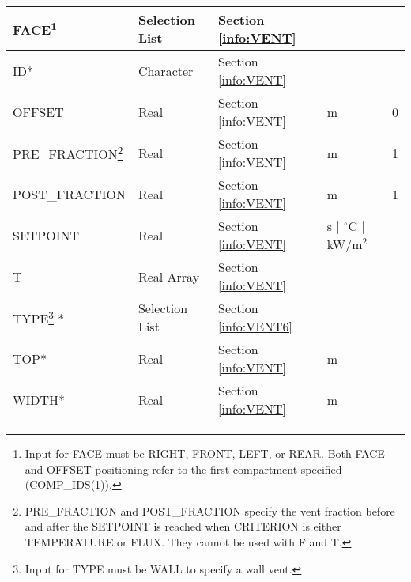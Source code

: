 \begin{minipage}{6.5in}
\begin{longtable}{@{\extracolsep{\fill}}|l|l|l|l|l|}
{\ct FACE}\footnote{Input for {\ct FACE} must be {\ct RIGHT}, {\ct FRONT}, {\ct LEFT}, or {\ct REAR}. Both {\ct FACE} and {\ct OFFSET} positioning refer to the first compartment specified ({\ct COMP\_IDS(1)}).}      	  & Selection List   & Section \ref{info:VENT}                 &                             &                 \\ \hline
{\ct ID}*                                                         & Character  	          & Section \ref{info:VENT}      &                             &                 \\ \hline
{\ct OFFSET}       					 & Real 		  & Section \ref{info:VENT}      & m                           &      0        \\ \hline
{\ct PRE\_FRACTION}\footnote{{\ct PRE\_FRACTION} and {\ct POST\_FRACTION} specify the vent fraction before and after the {\ct SETPOINT} is reached when {\ct CRITERION} is either {\ct TEMPERATURE} or {\ct FLUX}. They cannot be used with {\ct F} and {\ct T}.}       					 & Real 		  & Section \ref{info:VENT}      & m                           &      1        \\ \hline
{\ct POST\_FRACTION}       					 & Real 		  & Section \ref{info:VENT}      & m                           &      1        \\ \hline
{\ct SETPOINT}           					 & Real  	          & Section \ref{info:VENT}      & s $\mid$ $^\circ$C $\mid$ kW/m$^2$ &                 \\ \hline
{\ct T}  					 & Real Array  		  & Section \ref{info:VENT}      &                             &                 \\ \hline
{\ct TYPE}\footnote{Input for {\ct TYPE} must be {\ct WALL} to specify a wall vent. } *
                                                                 & Selection List         & Section \ref{info:VENT6}     &                             &                 \\ \hline
{\ct TOP}*                 & Real                   & Section \ref{info:VENT}      & m                        &                 \\ \hline
{\ct WIDTH}*                                                      & Real                   & Section \ref{info:VENT}      & m                           &                 \\ \hline
\end{longtable}
\end{minipage}


